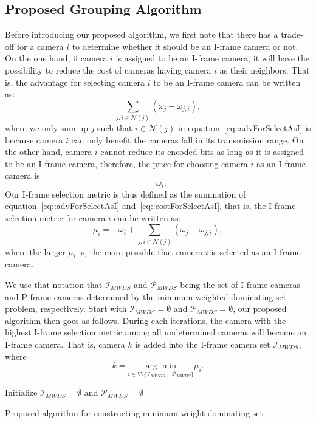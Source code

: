 \subsection{Proposed Grouping Algorithm}
Before introducing our proposed algorithm, we first note that there has a trade-off for a camera $i$ to determine whether it should be an I-frame camera or not.
On the one hand, if camera $i$ is assigned to be an I-frame camera, it will have the possibility to reduce the cost of cameras having camera $i$ as their neighbors.
That is, the advantage for selecting camera $i$ to be an I-frame camera can be written as:
\begin{equation}
\sum_{j:i \in \mathcal{N}(j)} \left( \omega_j - \omega_{j,i} \right),
\label{eq::advForSelectAsI}
\end{equation}
where we only sum up $j$ such that $i \in \mathcal{N}(j)$ in equation~\eqref{eq::advForSelectAsI} is because camera $i$ can only benefit the cameras fall in its transmission range.
On the other hand, camera $i$ cannot reduce its encoded bits as long as it is assigned to be an I-frame camera, therefore, the price for choosing camera $i$ as an I-frame camera is
\begin{equation}
- \omega_i.
\label{eq::costForSelectAsI}
\end{equation}
Our I-frame selection metric is thus defined as the summation of equation~\eqref{eq::advForSelectAsI} and~\eqref{eq::costForSelectAsI}, that is, the I-frame selection metric for camera $i$ can be written as:
\begin{equation}
\mu_i = - \omega_i + \sum_{j:i \in \mathcal{N}(j)} \left( \omega_j - \omega_{j,i} \right),
\label{eq::IFrameSelectionMetric}
\end{equation}
where the larger $\mu_i$ is, the more possible that camera $i$ is selected as an I-frame camera.

We use that notation that $\mathcal{I}_{MWDS}$ and $\mathcal{P}_{MWDS}$ being the set of I-frame cameras and P-frame cameras determined by the minimum weighted dominating set problem, respectively.
Start with $\mathcal{I}_{MWDS} = \emptyset$ and $\mathcal{P}_{MWDS} = \emptyset$, our proposed algorithm then goes as follows.
During each iterations, the camera with the highest I-frame selection metric among all undetermined cameras will become an I-frame camera.
That is, camera $k$ is added into the I-frame camera set $\mathcal{I}_{MWDS}$, where
\begin{equation}
k = \underset{i \in V \setminus \{ \mathcal{I}_{MWDS} \cup \mathcal{P}_{MWDS} \} }{\arg \min} \mu_i.
\end{equation}
%
\IncMargin{1em}
\begin{algorithm}[]
 \SetAlgoLined
 \Input{}
 \Output{}
 \BlankLine
 Initialize $\mathcal{I}_{MWDS} = \emptyset$ and $\mathcal{P}_{MWDS} = \emptyset$ \\
 \While{}
 {
 }
 \caption{\label{alg::minWeightDS}Proposed algorithm for constructing minimum weight dominating set}
\end{algorithm}
\DecMargin{1em}
%